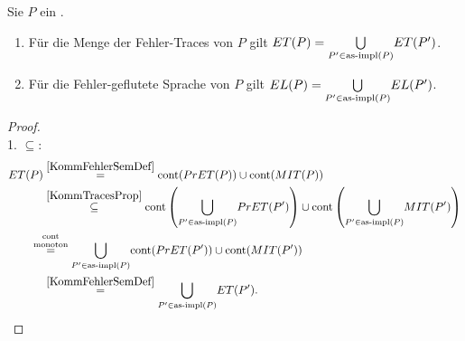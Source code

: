 \begin{Prop}
  \label{KommSemProp}
  Sie $P$ ein \MEIO{}.
  \begin{enumerate}
    \item Für die Menge der Fehler-Traces von $P$ gilt $ET (P) =
      \underset{P'\in\mathrm{as}\text{-}\mathrm{impl} (P)}{\bigcup} ET (P')$.
    \item Für die Fehler-geflutete Sprache von $P$ gilt $EL (P) =
      \underset{P'\in\mathrm{as}\text{-}\mathrm{impl} (P)}{\bigcup} EL (P')$.
  \end{enumerate}
\end{Prop}
\begin{proof}\mbox{}\\
  1. \glqq$\subseteq$\grqq{}:
  \begin{align*}
    \ET (P)&\overset{\ref{KommFehlerSemDef}}{=} \cont (\PrET (P))\cup \cont
    (\MIT (P))\\
    &\overset{\ref{KommTracesProp}}{\subseteq} \cont
    \left(\underset{P'\in\asimp (P)}{\bigcup} \PrET (P')\right)\cup \cont
    \left(\underset{P'\in\asimp (P)}{\bigcup} \MIT (P')\right)\\
    &\hspace{-0.4cm}\overset{\cont}{\overset{\text{monoton}}{=}}
    \underset{P'\in\asimp (P)}{\bigcup} \cont (\PrET (P'))\cup \cont (\MIT
    (P'))\\
    &\overset{\ref{KommFehlerSemDef}}{=} \underset{P'\in\asimp
    (P)}{\bigcup} \ET (P').\\
  \end{align*}


\end{proof}
